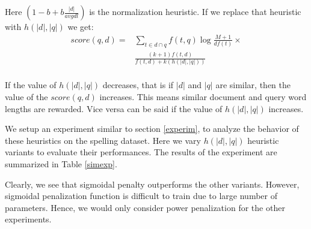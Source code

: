 Here $\left( 1 - b + b \frac{|d|}{avgdl} \right)$ is the normalization heuristic. If we replace that heuristic with $h(|d|, |q|)$ we get:
\begin{equation}
	\label{heuris}
	\begin{aligned}
		score(q, d) = & \sum_{t \in d \cap q} f(t, q) \log \frac{M + 1}{df(t)} \times \\
		& \frac{ (k + 1) f (t, d) }{f(t, d) + k \left( h(|d|, |q|) \right)}  \\
	\end{aligned}
\end{equation}

If the value of $h(|d|, |q|)$ decreases, that is if $|d|$ and $|q|$ are similar, then the value of the $score(q, d)$ increases. This means similar document and query word lengths are rewarded. Vice versa can be said if the value of $h(|d|, |q|)$ increases.



We setup an experiment similar to section \ref{experim}, to analyze the behavior of these heuristics on the spelling dataset.
Here we vary $h(|d|, |q|)$ heuristic variants to evaluate their performances.
The results of the experiment are summarized in Table \ref{simexp}.

	Clearly, we see that sigmoidal penalty outperforms the other variants. 
However, sigmoidal penalization function is difficult to train due to large number of parameters.
Hence, we would only consider power penalization for the other experiments. 